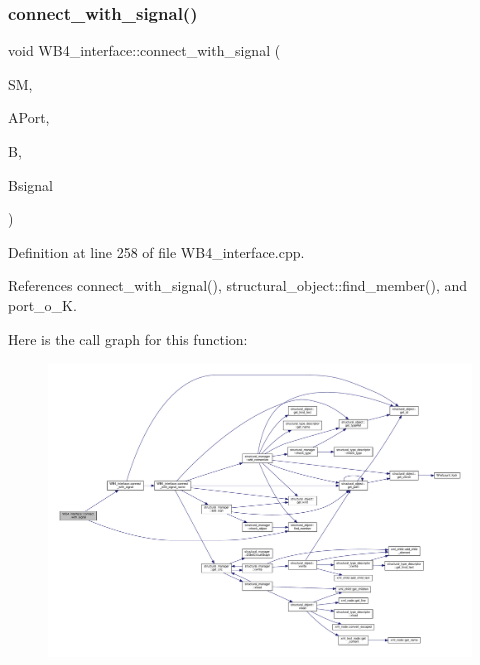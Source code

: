 \subsubsection{\texorpdfstring{connect\+\_\+with\+\_\+signal()}{connect\_with\_signal()}\hspace{0.1cm}{\footnotesize\ttfamily [3/4]}}
{\footnotesize\ttfamily void W\+B4\+\_\+interface\+::connect\+\_\+with\+\_\+signal (\begin{DoxyParamCaption}\item[{\hyperlink{structural__manager_8hpp_ab3136f0e785d8535f8d252a7b53db5b5}{structural\+\_\+manager\+Ref}}]{SM,  }\item[{\hyperlink{structural__objects_8hpp_a8ea5f8cc50ab8f4c31e2751074ff60b2}{structural\+\_\+object\+Ref}}]{A\+Port,  }\item[{\hyperlink{structural__objects_8hpp_a8ea5f8cc50ab8f4c31e2751074ff60b2}{structural\+\_\+object\+Ref}}]{B,  }\item[{std\+::string}]{Bsignal }\end{DoxyParamCaption})\hspace{0.3cm}{\ttfamily [protected]}}



Definition at line 258 of file W\+B4\+\_\+interface.\+cpp.



References connect\+\_\+with\+\_\+signal(), structural\+\_\+object\+::find\+\_\+member(), and port\+\_\+o\+\_\+K.

Here is the call graph for this function\+:
\nopagebreak
\begin{figure}[H]
\begin{center}
\leavevmode
\includegraphics[width=350pt]{d5/d7a/classWB4__interface_a1907373293fa2624bdb543f6e2dea8ac_cgraph}
\end{center}
\end{figure}
\mbox{\label{classWB4__interface_afc00c384ae6bf15c37a096f03693f026}} 
